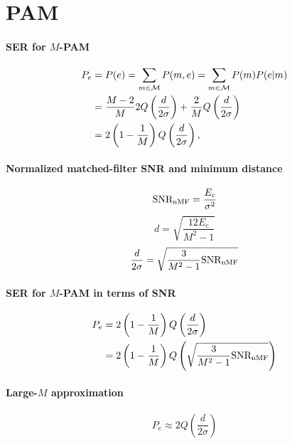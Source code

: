 \section*{PAM}

\paragraph{SER for $M$-PAM}
\begin{align}
P_e &= P(e) = \sum_{m \in {\cal M}} P(m,e) = \sum_{m \in {\cal M}} P(m) P(e|m) \\
&= \frac{M-2}{M} 2 Q \left(\frac{d}{2\sigma} \right) + \frac{2}{M}  Q\left( \frac{d}{2\sigma} \right) \\
&= 2 \left(1 - \frac{1}{M} \right) Q\left( \frac{d}{2\sigma} \right),
\label{eq:pam_pe_general}
\end{align}

\paragraph{Normalized matched-filter SNR and minimum distance}
\begin{equation}
{\textrm{SNR}}_{\textrm{nMF}} = \frac{E_c}{\sigma^2}
\label{eq:snrnormalizedMF}
\end{equation}
\begin{equation}
d = \sqrt{ \frac{12 E_c}{M^2 - 1} }
\label{eq:d_pam}
\end{equation}
\begin{equation}
\frac{d}{2 \sigma} = \sqrt{\frac{3}{M^2-1} {\textrm{SNR}}_{\textrm{nMF}}}
\label{eq:pamdistanceoversigma}
\end{equation}

\paragraph{SER for $M$-PAM in terms of SNR}
\begin{align}
	P_e  &= 2 \left(1 - \frac 1 M\right) Q \left( \frac{d}{2 \sigma} \right) \label{eq:pam_pe_snr} \\
	&=  2 \left(1 - \frac 1 M\right) Q \left( \sqrt{\frac{3}{M^2-1} {\textrm{SNR}}_{\textrm{nMF}}} \right)
\end{align}

\paragraph{Large-$M$ approximation}
\[
P_e \approx 2 Q \left( \frac{d}{2 \sigma} \right)
\]

